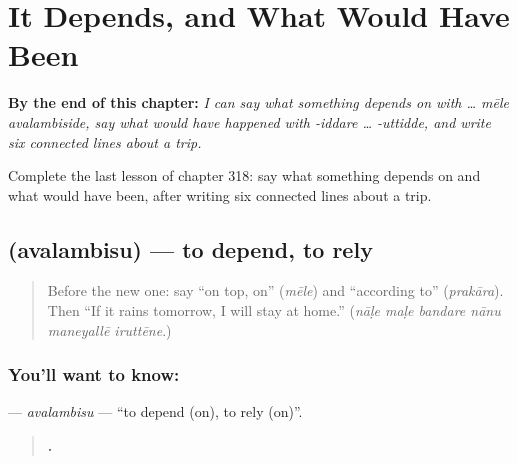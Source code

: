 
\chapter{It Depends, and What Would Have Been}
\label{ch:ka-it-depends-and-what-would-have-been}

\begin{chapteropening}
\textbf{By the end of this chapter:} \emph{I can say what something depends on with … mēle avalambiside, say what would have happened with -iddare … -uttidde, and write six connected lines about a trip.}

Complete the last lesson of chapter 318: say what something depends on and what would have been, after writing six connected lines about a trip.
\end{chapteropening}

\section[\texorpdfstring{\kn{ಅವಲಂಬಿಸು} (avalambisu)}{ಅವಲಂಬಿಸು (avalambisu)}]{ (avalambisu) — to depend, to rely}

\label{lesson:KA-C318-avalambisu}



\begin{quote}
Before the new one: say \textquotedblleft{}on top, on\textquotedblright{} (\emph{mēle}) and \textquotedblleft{}according to\textquotedblright{} (\emph{prakāra}). Then \textquotedblleft{}If it rains tomorrow, I will stay at home.\textquotedblright{} (\emph{nāḷe maḷe bandare nānu maneyallē iruttēne}.)
\end{quote}

\subsection*{You'll want to know: }
\textbf{} — \emph{avalambisu} — \textquotedblleft{}to depend (on), to rely (on)\textquotedblright{}.

\begin{quote}
\textbf{    .}
\end{quote}


